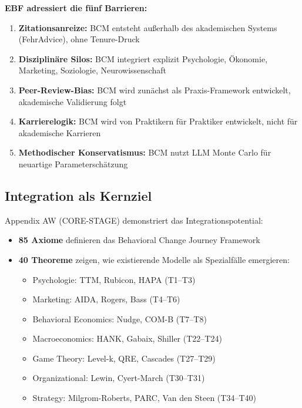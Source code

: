 \documentclass[12pt,a4paper]{article}
\begin{document}
\begin{tcolorbox}[colback=bcmgreen!5!white, colframe=bcmgreen!75!black]
\textbf{EBF adressiert die fünf Barrieren:}

\begin{enumerate}
\item \textbf{Zitationsanreize:} BCM entsteht außerhalb des akademischen Systems
      (FehrAdvice), ohne Tenure-Druck

\item \textbf{Disziplinäre Silos:} BCM integriert explizit Psychologie, Ökonomie,
      Marketing, Soziologie, Neurowissenschaft

\item \textbf{Peer-Review-Bias:} BCM wird zunächst als Praxis-Framework entwickelt,
      akademische Validierung folgt

\item \textbf{Karrierelogik:} BCM wird von Praktikern für Praktiker entwickelt,
      nicht für akademische Karrieren

\item \textbf{Methodischer Konservatismus:} BCM nutzt LLM Monte Carlo für
      neuartige Parameterschätzung
\end{enumerate}
\end{tcolorbox}

\subsection{Integration als Kernziel}

Appendix AW (CORE-STAGE) demonstriert das Integrationspotential:

\begin{itemize}
\item \textbf{85 Axiome} definieren das Behavioral Change Journey Framework
\item \textbf{40 Theoreme} zeigen, wie existierende Modelle als Spezialfälle emergieren:
  \begin{itemize}[nosep]
  \item Psychologie: TTM, Rubicon, HAPA (T1--T3)
  \item Marketing: AIDA, Rogers, Bass (T4--T6)
  \item Behavioral Economics: Nudge, COM-B (T7--T8)
  \item Macroeconomics: HANK, Gabaix, Shiller (T22--T24)
  \item Game Theory: Level-k, QRE, Cascades (T27--T29)
  \item Organizational: Lewin, Cyert-March (T30--T31)
  \item Strategy: Milgrom-Roberts, PARC, Van den Steen (T34--T40)
  \end{itemize}
\end{itemize}
\end{document}
